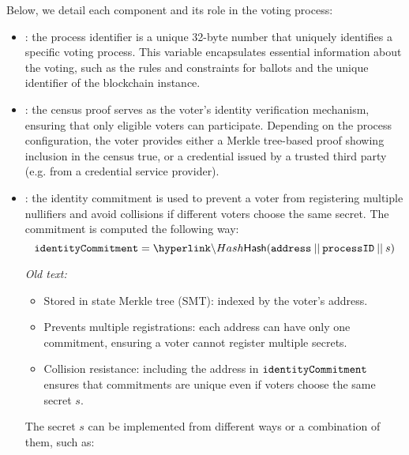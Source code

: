 

Below, we detail each component and its role in the voting process:
\begin{itemize}
	\item \processid: the process identifier is a unique 32-byte number that uniquely identifies a specific voting process. This variable encapsulates essential information about the voting, such as the rules and constraints for ballots and the unique identifier of the \davinci blockchain instance.
	\item \censuspf: the census proof serves as the voter's identity verification mechanism, ensuring that only eligible voters can participate. Depending on the process configuration, the voter provides either a Merkle tree-based proof showing inclusion in the census true, or a credential issued by a trusted third party (e.g. from a credential service provider).
	\item \commitment: the identity commitment is used to prevent a voter from registering multiple nullifiers and avoid collisions if different voters choose the same secret. The commitment is computed the following way:
	\[ \commitment = \hlget{\Hash}(\address \conc \processid \conc s)\]
	{\it Old text:
	\begin{itemize}
		\item Stored in state Merkle tree (SMT): indexed by the voter's address.
		\item Prevents multiple registrations: each address can have only one commitment, ensuring a voter cannot register multiple secrets.
		\item Collision resistance: including the address in $\texttt{identityCommitment}$ ensures that commitments are unique even if voters choose the same secret $s$.
	\end{itemize}
	
	The secret $s$ can be implemented from different ways or a combination of them, such as:
	
}
\end{itemize}
